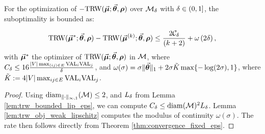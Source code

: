 \begin{lemma}
  \label{thm:convergence_fixed_eps_trw}
  For the optimization of $-\text{TRW}(\vec{\bm{\mu}};\vec{\bm{\theta}},\bm{\rho})$ over $\mathcal{M}_{\delta}$ with $\delta\in(0,1]$, the suboptimality is bounded as: 
  
	\begin{equation} 
		\text{TRW}(\vec{\bm{\mu}}^{*};\vec{\bm{\theta}},\bm{\rho}) - \text{TRW}(\vec{\bm{\mu}}^{(k)};\vec{\bm{\theta}},\bm{\rho}) \leq \frac{2\mathcal{C}_{\delta}}{(k+2)}+\omega \left( 2\delta \right), 
	\end{equation}
	 with $\vec{\bm{\mu}}^*$ the optimizer of $\text{TRW}(\vec{\bm{\mu}};\vec{\bm{\theta}},\bm{\rho})$ in $\mathcal{M}$, 
	 where $C_{\delta} \leq 16 \frac{|V|\max_{(ij)\in E}\textrm{VAL}_i\textrm{VAL}_j}{\delta}$, 
	 and $\omega(\sigma) = \sigma\|\vec{\bm{\theta}}\|_{1}+2\sigma \tilde{K}\max\{-\log (2\sigma),1\}$, where $\tilde{K} := 4 |V| \max_{ij \in E} \textrm{VAL}_i \textrm{VAL}_j$.
\end{lemma}
\begin{proof}
	Using $\operatorname{diam}_{\|\cdot \|_{\infty,1}}(\mathcal{M}) \leq 2$, and $L_\delta$ from Lemma \ref{lem:trw_bounded_lip_eps},
	we can compute $C_{\delta}\leq \operatorname{diam}(\mathcal{M})^2L_{\delta}$. 
	Lemma 
\ref{lem:trw_obj_weak_lipschitz} computes the modulus of continuity $\omega(\sigma)$.
The rate then follows directly from Theorem \ref{thm:convergence_fixed_eps}. 
\end{proof}



